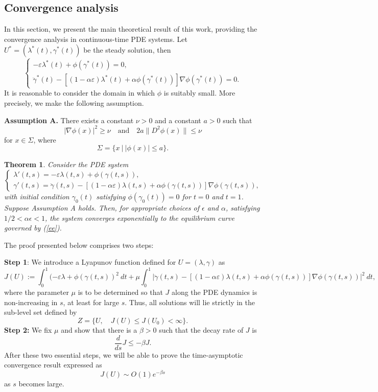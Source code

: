 \documentclass[12pt]{amsart}
\newtheorem{theorem}{Theorem}
\theoremstyle{definition}
\theoremstyle{remark}
\numberwithin{equation}{section}
\numberwithin{equation}{section}
\begin{document}
\subsection{Convergence analysis} In this section, we present the main theoretical result of this work,  providing the convergence analysis in continuous-time PDE systems. Let $U^*=(\lambda^*(t), \gamma^*(t))$ be the steady solution, then 
\begin{equation} \label{ee} 
\begin{cases}
        -\varepsilon\lambda^*(t) +\phi(\gamma^*(t)) = 0, \\
        \ddot{\gamma}^*(t)-[(1-\alpha\varepsilon)\lambda^*(t)+\alpha\phi(\gamma^*(t))]\nabla \phi(\gamma^*(t)) = 0.
    \end{cases}
\end{equation} 
It is reasonable to consider the domain in which  $\phi$ is suitably small. More precisely, we make the following assumption. 

{\textbf{Assumption A.} There exists a constant $\nu>0$ and a constant $a>0$ such that  
\[ |\nabla\phi(x)|^2 \geq \nu  \quad \text{and} \quad 2 a \|D^2 \phi(x)\| \leq \nu
\]
for $x\in \Sigma$, where 
$$
\Sigma = \{x~|~ |\phi(x)|\leq a\}. 
$$
}


\begin{theorem} \label{thm5} Consider the PDE system 
\[\begin{cases}
    \lambda'(t,s)  = -\varepsilon\lambda(t,s) +\phi(\gamma(t,s)),\\
    \gamma'(t,s) = \ddot{\gamma}(t,s)-[(1-\alpha\varepsilon)\lambda(t,s)+\alpha\phi(\gamma(t,s))]\nabla \phi(\gamma(t,s)), 
\end{cases}\]
with initial condition $\gamma_0(t)$ satisfying $\phi(\gamma_0(t))=0$
for $t=0$ and $t=1$. Suppose Assumption A holds. Then, for appropriate choices of $\epsilon$ and $\alpha$, satisfying  $1/2< \alpha \epsilon <1$, the system converges exponentially to the equilibrium curve governed by (\ref{ee}).    
\end{theorem}
The proof presented below comprises two steps:

{\bf Step 1}: We introduce a Lyapunov function defined for  $U = (\lambda, \gamma)$ as 
$$
J(U):=\int_0^1 (-\varepsilon\lambda + \phi(\gamma(t, s))^2~dt + \mu\int_0^1|\ddot{\gamma}(t,s)-[(1-\alpha\varepsilon)\lambda(t,s)+\alpha\phi(\gamma(t,s))]\nabla \phi(\gamma(t,s))|^2~dt,
$$
where the parameter $\mu$ is to be determined so that $J$ along the PDE dynamics is non-increasing in $s$, at least for large $s$. Thus,  all solutions will lie strictly in the sub-level set defined by  
$$
Z=\{U, \quad J(U)\leq J(U_0)<\infty\}. 
$$
{\bf Step 2:} We fix $\mu$ and show that there is a $\beta>0$ such that the decay rate of $J$ is 
$$
\frac{d}{ds}J \leq -\beta J. 
$$
After these two essential steps,  we will be able to prove the time-asymptotic convergence result expressed as 
$$
J(U) \sim  O(1) e^{-\beta s} 
$$
as $s$ becomes large. 
\end{document}

